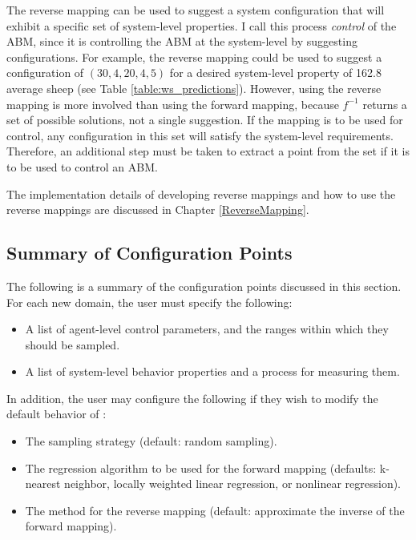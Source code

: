 The reverse mapping can be used to suggest a system configuration that will exhibit a specific set of system-level properties.
I call this process \textit{control} of the ABM, since it is controlling the ABM at the system-level by suggesting configurations.
For example, the reverse mapping could be used to suggest a configuration of $(30, 4, 20, 4, 5)$  for a desired system-level property of 162.8 average sheep (see Table \ref{table:ws_predictions}).
However, using the reverse mapping is more involved than using the forward mapping, because $f^{-1}$ returns a set of possible solutions, not a single suggestion.
If the mapping is to be used for control, any configuration in this set will satisfy the system-level requirements.
Therefore, an additional step must be taken to extract a point from the set if it is to be used to control an ABM.

The implementation details of developing reverse mappings and how to use the reverse mappings are discussed in Chapter \ref{ReverseMapping}.





\subsection{Summary of Configuration Points}

The following is a summary of the configuration points discussed in this section.
For each new domain, the user must specify the following:
\begin{itemize}
   \item A list of agent-level control parameters, and the ranges within which they should be sampled.
   \item A list of system-level behavior properties and a process for measuring them.
\end{itemize}

In addition, the user may configure the following if they wish to modify the default behavior of \fw:
\begin{itemize}
   \item The sampling strategy (default: random sampling).
   \item The regression algorithm to be used for the forward mapping (defaults: k-nearest neighbor, locally weighted linear regression, or nonlinear regression).
   \item The method for the reverse mapping (default: approximate the inverse of the forward mapping).
\end{itemize}


